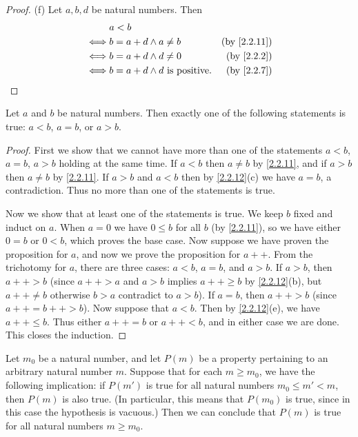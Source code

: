 \begin{proof}{(f)}
  Let \(a, b, d\) be natural numbers.
  Then
  \begin{align*}
         & a < b                                                              \\
    \iff & b = a + d \land a \neq b               & \text{(by \cref{2.2.11})} \\
    \iff & b = a + d \land d \neq 0               & \text{(by \cref{2.2.2})}  \\
    \iff & b = a + d \land d \text{ is positive}. & \text{(by \cref{2.2.7})}
  \end{align*}
\end{proof}

\begin{prop}\label{2.2.13}
  Let \(a\) and \(b\) be natural numbers.
  Then exactly one of the following statements is true: \(a < b\), \(a = b\), or \(a > b\).
\end{prop}

\begin{proof}
  First we show that we cannot have more than one of the statements \(a < b\), \(a = b\), \(a > b\) holding at the same time.
  If \(a < b\) then \(a \neq b\) by \cref{2.2.11}, and if \(a > b\) then \(a \neq b\) by \cref{2.2.11}.
  If \(a > b\) and \(a < b\) then by \cref{2.2.12}(c) we have \(a = b\), a contradiction.
  Thus no more than one of the statements is true.

  Now we show that at least one of the statements is true.
  We keep \(b\) fixed and induct on \(a\).
  When \(a = 0\) we have \(0 \leq b\) for all \(b\) (by \cref{2.2.11}), so we have either \(0 = b\) or \(0 < b\), which proves the base case.
  Now suppose we have proven the proposition for \(a\), and now we prove the proposition for \(a++\).
  From the trichotomy for \(a\), there are three cases: \(a < b\), \(a = b\), and \(a > b\).
  If \(a > b\), then \(a++ > b\) (since \(a++ > a\) and \(a > b\) implies \(a++ \geq b\) by \cref{2.2.12}(b), but \(a++ \neq b\) otherwise \(b > a\) contradict to \(a > b\)).
  If \(a = b\), then \(a++ > b\) (since \(a++ = b++ > b\)).
  Now suppose that \(a < b\).
  Then by \cref{2.2.12}(e), we have \(a++ \leq b\).
  Thus either \(a++ = b\) or \(a++ < b\), and in either case we are done.
  This closes the induction.
\end{proof}

\begin{prop}\label{2.2.14}
  Let \(m_0\) be a natural number, and let \(P(m)\) be a property pertaining to an arbitrary natural number \(m\).
  Suppose that for each \(m \geq m_0\), we have the following implication: if \(P(m')\) is true for all natural numbers \(m_0 \leq m' < m\), then \(P(m)\) is also true.
  (In particular, this means that \(P(m_0)\) is true, since in this case the hypothesis is vacuous.)
  Then we can conclude that \(P(m)\) is true for all natural numbers \(m \geq m_0\).
\end{prop}

